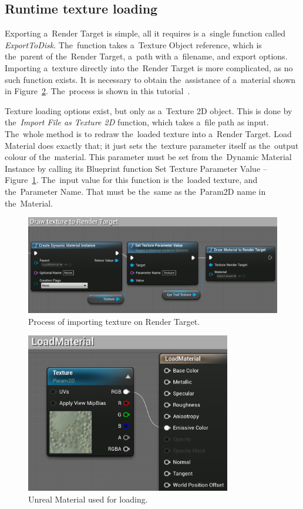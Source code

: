 \subsection{Runtime texture loading}
\label{sec:texture-loading}

Exporting a~Render Target is simple, all it requires is a~single function called \emph{ExportToDisk}. The~function takes a~Texture Object reference, which is the~parent of the~Render Target, a~path with a~filename, and export options. Importing a~texture directly into the~Render Target is more complicated, as no such function exists. It is necessary to obtain the~assistance of a~material shown in Figure~\ref{fig:load-material}. The~process is shown in this tutorial~\cite{texture-loading-tutorial}.

Texture loading options exist, but only as a~Texture 2D object. This is done by the~\emph{Import File as Texture 2D} function, which takes a~file path as input. The~whole method is to redraw the~loaded texture into a~Render Target. Load Material does exactly that; it just sets the~texture parameter itself as the~output colour of the~material. This parameter must be set from the~Dynamic Material Instance by calling its Blueprint function Set Texture Parameter Value -- Figure~\ref{fig:unreal-texture-loading}. The~input value for this function is the~loaded texture, and the~Parameter Name. That must be the~same as the~Param2D name in the~Material.


\begin{figure}[!ht]\centering
    \includegraphics[width=\textwidth]{img/texture-loading.png}
    \caption{Process of importing texture on Render Target.}
    \label{fig:unreal-texture-loading}
\end{figure}

\begin{figure}[!ht]\centering
    \includegraphics[width=0.8\textwidth]{img/load-material.png}
    \caption[Unreal Material used for loading.]{Unreal Material used for loading.~\cite{texture-loading-tutorial}}
    \label{fig:load-material}
\end{figure}
